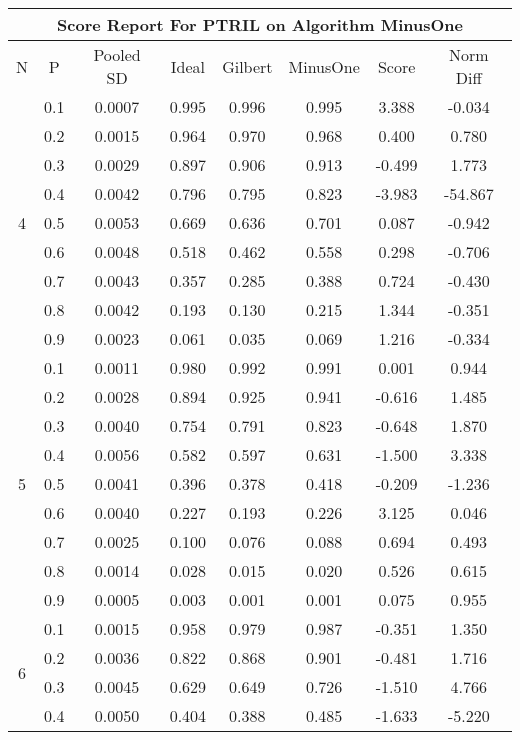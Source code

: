 \documentclass[11pt,a4paper]{report}
\begin{document}
\begin{longtable}{ | c | c || c | c | c | c | c | c | }
\hline
\multicolumn{8}{|c|}{ Score Report For PTRIL on Algorithm MinusOne} \\
\hline
N & P & Pooled SD &  Ideal &  Gilbert & MinusOne  & Score & Norm Diff \\
 \hline
 \hline
 \endhead
\multirow{9}{*}{4} & 0.1 & 0.0007 & 0.995 & 0.996 & 0.995 & 3.388 & -0.034 \\
 & 0.2 & 0.0015 & 0.964 & 0.970 & 0.968 & 0.400 & 0.780 \\
 & 0.3 & 0.0029 & 0.897 & 0.906 & 0.913 & -0.499 & 1.773 \\
 & 0.4 & 0.0042 & 0.796 & 0.795 & 0.823 & -3.983 & -54.867 \\
 & 0.5 & 0.0053 & 0.669 & 0.636 & 0.701 & 0.087 & -0.942 \\
 & 0.6 & 0.0048 & 0.518 & 0.462 & 0.558 & 0.298 & -0.706 \\
 & 0.7 & 0.0043 & 0.357 & 0.285 & 0.388 & 0.724 & -0.430 \\
 & 0.8 & 0.0042 & 0.193 & 0.130 & 0.215 & 1.344 & -0.351 \\
 & 0.9 & 0.0023 & 0.061 & 0.035 & 0.069 & 1.216 & -0.334 \\
 \hline
\multirow{9}{*}{5} & 0.1 & 0.0011 & 0.980 & 0.992 & 0.991 & 0.001 & 0.944 \\
 & 0.2 & 0.0028 & 0.894 & 0.925 & 0.941 & -0.616 & 1.485 \\
 & 0.3 & 0.0040 & 0.754 & 0.791 & 0.823 & -0.648 & 1.870 \\
 & 0.4 & 0.0056 & 0.582 & 0.597 & 0.631 & -1.500 & 3.338 \\
 & 0.5 & 0.0041 & 0.396 & 0.378 & 0.418 & -0.209 & -1.236 \\
 & 0.6 & 0.0040 & 0.227 & 0.193 & 0.226 & 3.125 & 0.046 \\
 & 0.7 & 0.0025 & 0.100 & 0.076 & 0.088 & 0.694 & 0.493 \\
 & 0.8 & 0.0014 & 0.028 & 0.015 & 0.020 & 0.526 & 0.615 \\
 & 0.9 & 0.0005 & 0.003 & 0.001 & 0.001 & 0.075 & 0.955 \\
 \hline
\multirow{9}{*}{6} & 0.1 & 0.0015 & 0.958 & 0.979 & 0.987 & -0.351 & 1.350 \\
 & 0.2 & 0.0036 & 0.822 & 0.868 & 0.901 & -0.481 & 1.716 \\
 & 0.3 & 0.0045 & 0.629 & 0.649 & 0.726 & -1.510 & 4.766 \\
 & 0.4 & 0.0050 & 0.404 & 0.388 & 0.485 & -1.633 & -5.220 \\

\end{longtable}
\end{document}
